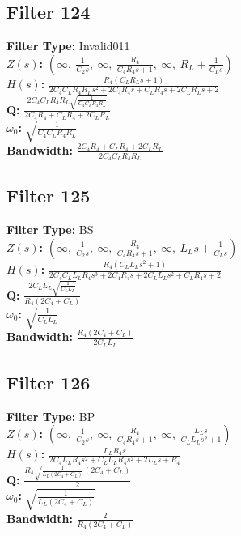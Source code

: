 \documentclass{article}
\begin{document}
\subsection*{Filter 124}
\textbf{Filter Type:} Invalid011 \\ 
\textbf{$Z(s)$:} $\left( \infty, \  \frac{1}{C_{2} s}, \  \infty, \  \frac{R_{4}}{C_{4} R_{4} s + 1}, \  \infty, \  R_{L} + \frac{1}{C_{L} s}\right)$ \\ 
\textbf{$H(s)$:} $\frac{R_{4} \left(C_{L} R_{L} s + 1\right)}{2 C_{4} C_{L} R_{4} R_{L} s^{2} + 2 C_{4} R_{4} s + C_{L} R_{4} s + 2 C_{L} R_{L} s + 2}$ \\ 
\textbf{Q:} $\frac{2 C_{4} C_{L} R_{4} R_{L} \sqrt{\frac{1}{C_{4} C_{L} R_{4} R_{L}}}}{2 C_{4} R_{4} + C_{L} R_{4} + 2 C_{L} R_{L}}$ \\ 
\textbf{$\omega_0$:} $\sqrt{\frac{1}{C_{4} C_{L} R_{4} R_{L}}}$ \\ 
\textbf{Bandwidth:} $\frac{2 C_{4} R_{4} + C_{L} R_{4} + 2 C_{L} R_{L}}{2 C_{4} C_{L} R_{4} R_{L}}$ \\ 
\subsection*{Filter 125}
\textbf{Filter Type:} BS \\ 
\textbf{$Z(s)$:} $\left( \infty, \  \frac{1}{C_{2} s}, \  \infty, \  \frac{R_{4}}{C_{4} R_{4} s + 1}, \  \infty, \  L_{L} s + \frac{1}{C_{L} s}\right)$ \\ 
\textbf{$H(s)$:} $\frac{R_{4} \left(C_{L} L_{L} s^{2} + 1\right)}{2 C_{4} C_{L} L_{L} R_{4} s^{3} + 2 C_{4} R_{4} s + 2 C_{L} L_{L} s^{2} + C_{L} R_{4} s + 2}$ \\ 
\textbf{Q:} $\frac{2 C_{L} L_{L} \sqrt{\frac{1}{C_{L} L_{L}}}}{R_{4} \left(2 C_{4} + C_{L}\right)}$ \\ 
\textbf{$\omega_0$:} $\sqrt{\frac{1}{C_{L} L_{L}}}$ \\ 
\textbf{Bandwidth:} $\frac{R_{4} \left(2 C_{4} + C_{L}\right)}{2 C_{L} L_{L}}$ \\ 
\subsection*{Filter 126}
\textbf{Filter Type:} BP \\ 
\textbf{$Z(s)$:} $\left( \infty, \  \frac{1}{C_{2} s}, \  \infty, \  \frac{R_{4}}{C_{4} R_{4} s + 1}, \  \infty, \  \frac{L_{L} s}{C_{L} L_{L} s^{2} + 1}\right)$ \\ 
\textbf{$H(s)$:} $\frac{L_{L} R_{4} s}{2 C_{4} L_{L} R_{4} s^{2} + C_{L} L_{L} R_{4} s^{2} + 2 L_{L} s + R_{4}}$ \\ 
\textbf{Q:} $\frac{R_{4} \sqrt{\frac{1}{L_{L} \left(2 C_{4} + C_{L}\right)}} \left(2 C_{4} + C_{L}\right)}{2}$ \\ 
\textbf{$\omega_0$:} $\sqrt{\frac{1}{L_{L} \left(2 C_{4} + C_{L}\right)}}$ \\ 
\textbf{Bandwidth:} $\frac{2}{R_{4} \left(2 C_{4} + C_{L}\right)}$ \\ 
\end{document}
